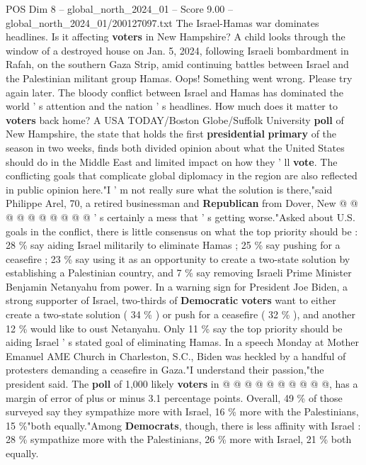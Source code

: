 \begin{textsample}{POS Dim 8 – global\_north\_2024\_01 – Score 9.00 – global\_north\_2024\_01/200127097.txt}  \label{ex:f8_pos_181}
The Israel-Hamas war dominates headlines.
Is it affecting \textbf{voters} in New Hampshire?
A child looks through the window of a destroyed house on Jan. 5, 2024, following Israeli bombardment in Rafah, on the southern Gaza Strip, amid continuing battles between Israel and the Palestinian militant group Hamas.
Oops!
Something went wrong.
Please try again later.
The bloody conflict between Israel and Hamas has dominated the world ' s attention and the nation ' s headlines.
How much does it matter to \textbf{voters} back home?
A USA TODAY/Boston Globe/Suffolk University \textbf{poll} of New Hampshire, the state that holds the first \textbf{presidential} \textbf{primary} of the season in two weeks, finds both divided opinion about what the United States should do in the Middle East and limited impact on how they ' ll \textbf{vote}.
The conflicting goals that complicate global diplomacy in the region are also reflected in public opinion here."I ' m not really sure what the solution is there,"said Philippe Arel, 70, a retired businessman and \textbf{Republican} from Dover, New @ @ @ @ @ @ @ @ @ @ ' s certainly a mess that ' s getting worse."Asked about U.S. goals in the conflict, there is little consensus on what the top priority should be : 28 \% say aiding Israel militarily to eliminate Hamas ; 25 \% say pushing for a ceasefire ; 23 \% say using it as an opportunity to create a two-state solution by establishing a Palestinian country, and 7 \% say removing Israeli Prime Minister Benjamin Netanyahu from power.
In a warning sign for President Joe Biden, a strong supporter of Israel, two-thirds of \textbf{Democratic} \textbf{voters} want to either create a two-state solution ( 34 \% ) or push for a ceasefire ( 32 \% ), and another 12 \% would like to oust Netanyahu.
Only 11 \% say the top priority should be aiding Israel ' s stated goal of eliminating Hamas.
In a speech Monday at Mother Emanuel AME Church in Charleston, S.C., Biden was heckled by a handful of protesters demanding a ceasefire in Gaza."I understand their passion,"the president said.
The \textbf{poll} of 1,000 likely \textbf{voters} in @ @ @ @ @ @ @ @ @ @, has a margin of error of plus or minus 3.1 percentage points.
Overall, 49 \% of those surveyed say they sympathize more with Israel, 16 \% more with the Palestinians, 15 \%"both equally."Among \textbf{Democrats}, though, there is less affinity with Israel : 28 \% sympathize more with the Palestinians, 26 \% more with Israel, 21 \% both equally.

\end{textsample}
